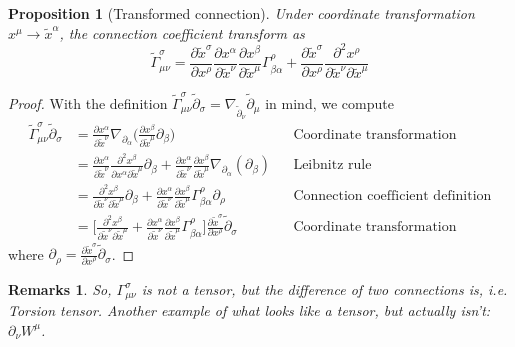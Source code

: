 \documentclass[a4paper]{article}
\newtheorem{remarks}{Remarks}[section]
\theoremstyle{new}
\newtheorem{prop}{Proposition}[section]
\begin{document}
\begin{prop}[Transformed connection]
Under coordinate transformation $x^\mu\rightarrow\tilde{x}^\alpha$, the connection coefficient transform as
\begin{equation}
\tilde{\Gamma}^\sigma_{\mu\nu}=\frac{\partial\tilde{x}^\sigma}{\partial x^\rho}\frac{\partial x^\alpha}{\partial\tilde{x}^\nu}\frac{\partial x^\beta}{\partial\tilde{x}^\mu}\Gamma_{\beta\alpha}^\rho+\frac{\partial\tilde{x}^\sigma}{\partial x^\rho}\frac{\partial^2x^\rho}{\partial\tilde{x}^\nu\partial\tilde{x}^\mu}\label{transformedconnection}
\end{equation}
\end{prop}
\begin{proof}
With the definition $\tilde{\Gamma}^\sigma_{\mu\nu}\tilde{\partial}_\sigma=\nabla_{\tilde{\partial}_\nu}\tilde{\partial}_\mu$ in mind, we compute
\begin{align}
    \tilde{\Gamma}^\sigma_{\mu\nu}\tilde{\partial}_\sigma&=\frac{\partial x^\alpha}{\partial\tilde{x}^\nu}\nabla_{\partial_\alpha}\bigg(\frac{\partial x^\beta}{\partial\tilde{x}^\mu}\partial_\beta\bigg)&&\text{Coordinate transformation}\nonumber\\
    &=\frac{\partial x^\alpha}{\partial\tilde{x}^\nu}\frac{\partial^2x^\beta}{\partial x^\alpha\partial\tilde{x}^\mu}\partial_\beta+\frac{\partial x^\alpha}{\partial\tilde{x}^\nu}\frac{\partial x^\beta}{\partial\tilde{x}^\mu}\nabla_{\partial_\alpha}(\partial_\beta)&&\text{Leibnitz rule}\nonumber\\
    &=\frac{\partial^2x^\beta}{\partial\tilde{x}^\nu\partial\tilde{x}^\mu}\partial_\beta+\frac{\partial x^\alpha}{\partial\tilde{x}^\nu}\frac{\partial x^\beta}{\partial\tilde{x}^\mu}\Gamma_{\beta\alpha}^\rho\partial_\rho&&\text{Connection coefficient definition}\nonumber\\
    &=\bigg[\frac{\partial^2x^\beta}{\partial\tilde{x}^\nu\partial\tilde{x}^\mu}+\frac{\partial x^\alpha}{\partial\tilde{x}^\nu}\frac{\partial x^\beta}{\partial\tilde{x}^\mu}\Gamma_{\beta\alpha}^\rho\bigg]\frac{\partial\tilde{x}^\sigma}{\partial x^\rho}\tilde{\partial}_\sigma&&\text{Coordinate transformation}\nonumber
\end{align}
where $\partial_\rho=\frac{\partial\tilde{x}^\sigma}{\partial x^\rho}\tilde{\partial}_\sigma$.
\end{proof}
\begin{remarks}
So, $\Gamma_{\mu\nu}^\sigma$ is not a tensor, but the difference of two connections is, i.e. Torsion tensor. Another example of what looks like a tensor, but actually isn't: $\partial_\nu W^\mu$. 
\end{remarks}
\end{document}
